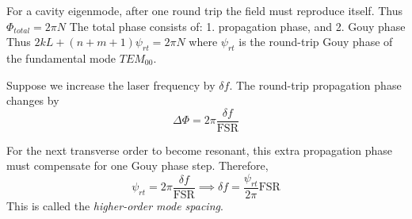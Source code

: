 \documentclass{report}
\begin{document}
For a cavity eigenmode, after one round trip the field must reproduce itself. Thus $\Phi_{total}=2\pi N$ The total phase consists of: 1. propagation phase, and 2. Gouy phase
Thus $2kL+(n+m+1)\psi_{rt}=2\pi N$ where $\psi_{rt}$ is the round-trip Gouy phase of the fundamental mode $TEM_{00}$.

Suppose we increase the laser frequency by $\delta f$. The round-trip propagation phase changes by 
\begin{equation}
    \Delta \Phi = 2\pi \frac{\delta f}{\text{FSR}}
\end{equation}

For the next transverse order to become resonant, this extra propagation phase must compensate for one Gouy phase step. Therefore, 
\begin{equation}
    \psi_{rt} = 2\pi \frac{\delta f}{\text{FSR}} \implies \boxed{\delta f = \frac{\psi_{rt}}{2\pi}\text{FSR}}
\end{equation}
This is called the \textit{higher-order mode spacing}.





\end{document}
